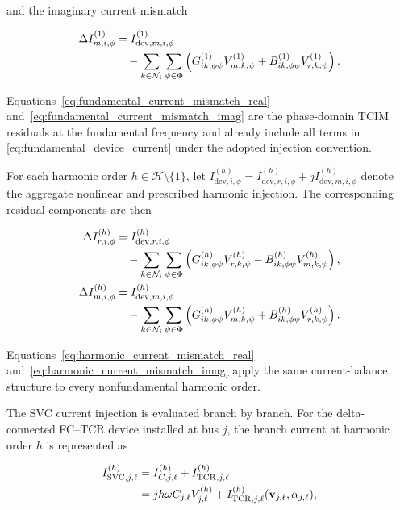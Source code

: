 \documentclass[journal]{IEEEtran}
\begin{document}
\noindent and the imaginary current mismatch

\begin{align}
\Delta I_{m,i,\phi}^{(1)}
&=I_{\mathrm{dev},m,i,\phi}^{(1)}
\notag\\
&\quad-
\sum_{k\in\mathcal{N}_i}\sum_{\psi\in\Phi}
\left(
G_{ik,\phi\psi}^{(1)}V_{m,k,\psi}^{(1)}
+B_{ik,\phi\psi}^{(1)}V_{r,k,\psi}^{(1)}
\right).
\label{eq:fundamental_current_mismatch_imag}
\end{align}

Equations~\eqref{eq:fundamental_current_mismatch_real}
and~\eqref{eq:fundamental_current_mismatch_imag} are the phase-domain TCIM
residuals at the fundamental frequency and already include all terms in
\eqref{eq:fundamental_device_current} under the adopted injection convention.

For each harmonic order $h\in\mathcal{H}\setminus\{1\}$, let
$I_{\mathrm{dev},i,\phi}^{(h)}=I_{\mathrm{dev},r,i,\phi}^{(h)}+
jI_{\mathrm{dev},m,i,\phi}^{(h)}$ denote the aggregate nonlinear and
prescribed harmonic injection. The corresponding residual components are
then

\begin{align}
\Delta I_{r,i,\phi}^{(h)}
&=I_{\mathrm{dev},r,i,\phi}^{(h)}
\notag\\
&\quad-\sum_{k\in\mathcal{N}_i}\sum_{\psi\in\Phi}
\left(
G_{ik,\phi\psi}^{(h)}V_{r,k,\psi}^{(h)}
-B_{ik,\phi\psi}^{(h)}V_{m,k,\psi}^{(h)}
\right),
\label{eq:harmonic_current_mismatch_real}\\
\Delta I_{m,i,\phi}^{(h)}
&=I_{\mathrm{dev},m,i,\phi}^{(h)}
\notag\\
&\quad-\sum_{k\in\mathcal{N}_i}\sum_{\psi\in\Phi}
\left(
G_{ik,\phi\psi}^{(h)}V_{m,k,\psi}^{(h)}
+B_{ik,\phi\psi}^{(h)}V_{r,k,\psi}^{(h)}
\right).
\label{eq:harmonic_current_mismatch_imag}
\end{align}

Equations~\eqref{eq:harmonic_current_mismatch_real}
and~\eqref{eq:harmonic_current_mismatch_imag} apply the same current-balance
structure to every nonfundamental harmonic order.

The SVC current injection is evaluated branch by branch. For the
delta-connected FC--TCR device installed at bus $j$, the branch current at
harmonic order $h$ is represented as

\begin{align}
    I_{\mathrm{SVC},j,\ell}^{(h)}
    &= I_{C,j,\ell}^{(h)} + I_{\mathrm{TCR},j,\ell}^{(h)} \notag \\
    &= jh\omega C_{j,\ell}V_{j,\ell}^{(h)}
      + I_{\mathrm{TCR},j,\ell}^{(h)}
        (\mathbf{v}_{j,\ell},\alpha_{j,\ell}),
    \label{eq:svc_phase_current_mict}
\end{align}
\end{document}
